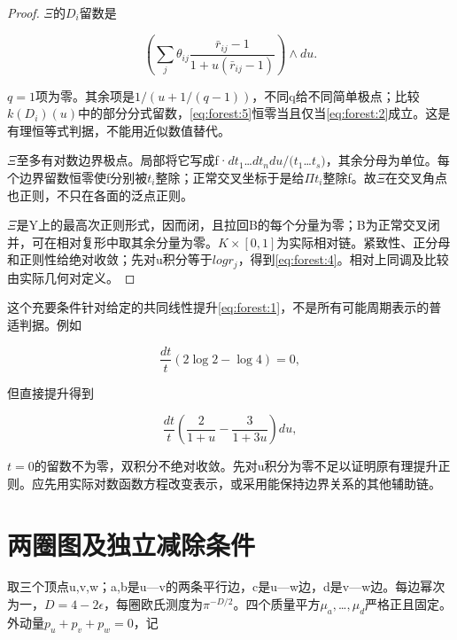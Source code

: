 \documentclass[11pt,a4paper,oneside]{ctexrep}
\theoremstyle{cnplain}
\theoremstyle{definition}
\theoremstyle{remark}
\begin{document}
\begin{proof}

\(\Xi \)的\(D_i\)留数是

\begin{equation}
\left(\sum_j\theta_{ij}
       \frac{\bar r_{ij}-1}{1+u(\bar r_{ij}-1)}\right)\wedge du.   \label{eq:forest:5}
\end{equation}

\(q=1\)项为零。其余项是\(1/(u+1/(q- 1))\)，不同q给不同简单极点；比较\(k(D_i)(u)\)中的部分分式留数，\eqref{eq:forest:5}恒零当且仅当\eqref{eq:forest:2}成立。这是有理恒等式判据，不能用近似数值替代。

\(\Xi \)至多有对数边界极点。局部将它写成f·\(dt_1\)\ldots{}\(dt_n du/(t_1\)\ldots{}\(t_s)\)，其余分母为单位。每个边界留数恒零使f分别被\(t_i\)整除；正常交叉坐标于是给\(\Pi t_i\)整除f。故\(\Xi \)在交叉角点也正则，不只在各面的泛点正则。

\(\Xi \)是Y上的最高次正则形式，因而闭，且拉回B的每个分量为零；B为正常交叉闭并，可在相对复形中取其余分量为零。\(K\times [0,1]\)为实际相对链。紧致性、正分母和正则性给绝对收敛；先对u积分等于\(log r_j\)，得到\eqref{eq:forest:4}。相对上同调及比较由实际几何对定义。

\end{proof}

这个充要条件针对给定的共同线性提升\eqref{eq:forest:1}，不是所有可能周期表示的普适判据。例如

\begin{equation}
\frac{dt}{t}(2\log2-\log4)=0,
\end{equation}

但直接提升得到

\begin{equation}
\frac{dt}{t}
 \left(\frac2{1+u}-\frac3{1+3u}\right)du,                        \label{eq:forest:6}
\end{equation}

\(t=0\)的留数不为零，双积分不绝对收敛。先对u积分为零不足以证明原有理提升正则。应先用实际对数函数方程改变表示，或采用能保持边界关系的其他辅助链。

\section{两圈图及独立减除条件}\label{sec:forest:2}

取三个顶点u,v,w；a,b是u---v的两条平行边，c是u---w边，d是v---w边。每边幂次为一，\(D=4- 2\epsilon \)，每圈欧氏测度为\(\pi ^{- D/2}\)。四个质量平方\(\mu _a,\)\ldots{}\(,\mu _d\)严格正且固定。外动量\(p_u+p_v+p_w=0\)，记
\end{document}
